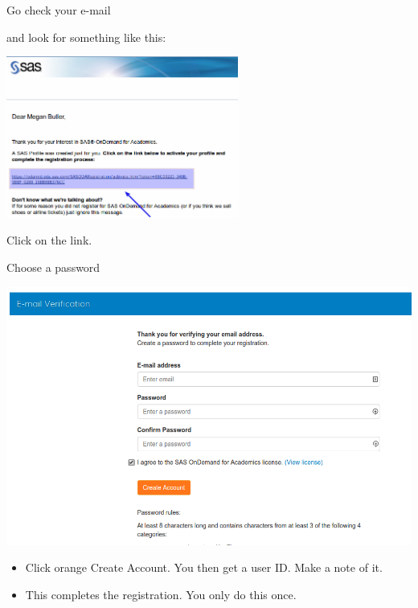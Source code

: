 \documentclass[unknownkeysallowed]{beamer}\usepackage[]{graphicx}\usepackage[]{color}
\begin{document}
\begin{frame}[fragile]{Go check your e-mail}

and look for something like this:

\includegraphics[width=3in]{sas3}

Click on the link.
  
\end{frame}

\begin{frame}[fragile]{Choose a password}

\includegraphics[height=0.7\textheight]{sas5}

  \begin{itemize}
  \item Click orange Create Account. You then get a user ID. Make a note of it.
  \item This completes the registration. You only do this once.
  \end{itemize}
  
\end{frame}
\end{document}
